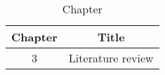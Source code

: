 \begin{table}[h!]
\centering
\begin{tabular}{cc}
{Chapter} & {Title} \\ \midrule
{3} & {Literature review} \\
\end{tabular}
\caption{Chapter }
\label{table:1}
\end{table}